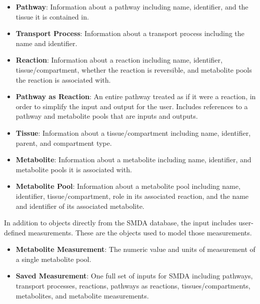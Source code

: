 \begin{itemize}

    \item \textbf{Pathway}: Information about a pathway including name,
    identifier, and the tissue it is contained in.

    \item \textbf{Transport Process}: Information about a transport process
    including the name and identifier.

    \item \textbf{Reaction}: Information about a reaction including name,
    identifier, tissue/compartment, whether the reaction is reversible, and
    metabolite pools the reaction is associated with.

    \item \textbf{Pathway as Reaction}: An entire pathway treated as if it were
    a reaction, in order to simplify the input and output for the user. Includes
    references to a pathway and metabolite pools that are inputs and outputs.

    \item \textbf{Tissue}: Information about a tissue/compartment including
    name, identifier, parent, and compartment type.

    \item \textbf{Metabolite}: Information about a metabolite including name,
    identifier, and metabolite pools it is associated with.

    \item \textbf{Metabolite Pool}: Information about a metabolite pool
    including name, identifier, tissue/compartment, role in its associated
    reaction, and the name and identifier of its associated metabolite.

\end{itemize}

In addition to objects directly from the SMDA database, the input includes
user-defined measurements. These are the objects used to model those
measurements.

\begin{itemize}

    \item \textbf{Metabolite Measurement}: The numeric value and units of
    measurement of a single metabolite pool.

    \item \textbf{Saved Measurement}: One full set of inputs for SMDA including
    pathways, transport processes, reactions, pathways as reactions,
    tissues/compartments, metabolites, and metabolite measurements.

\end{itemize}

